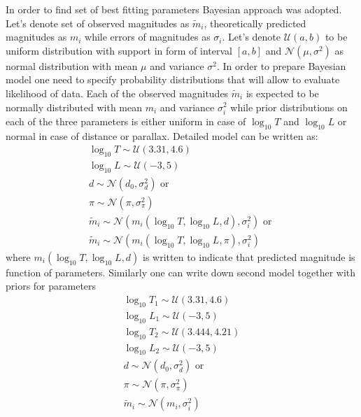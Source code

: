 \documentclass{pracalicmgr}
\begin{document}
In order to find set of best fitting parameters Bayesian approach was adopted. Let's denote set of observed magnitudes as $\tilde{m}_i$, theoretically predicted
magnitudes as $m_i$ while errors of magnitudes as $\sigma_i$. Let's denote $\mathcal{U}(a,b)$ to be uniform distribution with support in form of interval $[a,b]$ and $\mathcal{N}(\mu,\sigma^2)$ as
normal distribution with mean $\mu$ and variance $\sigma^2$. In order to prepare Bayesian model one need to specify probability distributions that will allow to evaluate likelihood of 
data. Each of the observed magnitudes $\tilde{m}_i$ is expected to be normally distributed with mean $m_i$ and variance $\sigma_i^2$ while prior distributions on each of the three parameters
is either uniform in case of $\log_{10} T$ and $\log_{10} L$ or normal in case of distance or parallax. Detailed model can be written as:
\begin{equation}
    \begin{split}
    \log_{10}{T}\sim \mathcal{U}(3.31,4.6)\\
    \log_{10}{L} \sim \mathcal{U}(-3,5)\\
    d \sim \mathcal{N}(d_0,\sigma_d^2) \textrm{ or } \\
    \pi \sim \mathcal{N} (\pi,\sigma_{\pi}^2)\\
    \tilde{m}_i\sim \mathcal{N}(m_i(\log_{10} T, \log_{10} L, d ),\sigma_i^2) \textrm{ or }\\
    \tilde{m}_i\sim \mathcal{N}(m_i(\log_{10} T, \log_{10} L, \pi ),\sigma_i^2)
    \end{split}
\end{equation}
where  $m_i(\log_{10} T, \log_{10} L, d )$ is written to indicate that predicted magnitude is function of parameters. 
Similarly one can write down second model together with priors for parameters
\begin{equation}
    \begin{split}
    \log_{10}{T_1}\sim \mathcal{U}(3.31,4.6)\\
    \log_{10}{L_1} \sim \mathcal{U}(-3,5)\\
    \log_{10}{T_2}\sim \mathcal{U}(3.444,4.21)\\
    \log_{10}{L_2} \sim \mathcal{U}(-3,5)\\
    d \sim \mathcal{N}(d_0,\sigma_d^2) \textrm{ or } \\
    \pi \sim \mathcal{N} (\pi,\sigma_{\pi}^2)\\
    \tilde{m}_i\sim \mathcal{N}(m_i,\sigma_i^2)
    \end{split}
\end{equation}
\end{document}
